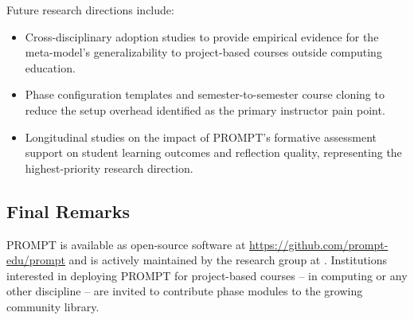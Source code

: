 Future research directions include:
\begin{itemize}
    \item Cross-disciplinary adoption studies to provide empirical evidence for the meta-model's generalizability to project-based courses outside computing education.
    \item Phase configuration templates and semester-to-semester course cloning to reduce the setup overhead identified as the primary instructor pain point.
    \item Longitudinal studies on the impact of PROMPT's formative assessment support on student learning outcomes and reflection quality, representing the highest-priority research direction.
\end{itemize}

\subsection{Final Remarks}

PROMPT is available as open-source software at \url{https://github.com/prompt-edu/prompt} and is actively maintained by the \group{} research group at \university{}.
Institutions interested in deploying PROMPT for project-based courses -- in computing or any other discipline -- are invited to contribute phase modules to the growing community library.
